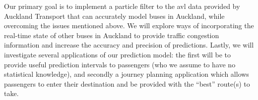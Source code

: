 \documentclass[12pt,a4paper]{article}
\newcommand{\pf}{particle filter}
\begin{document}
Our primary goal is to implement a \pf{} to the \gls{avl} data provided by Auckland Transport
that can accurately model buses in Auckland,
while overcoming the issues mentioned above.
We will explore ways of incorporating the real-time state of other buses in Auckland
to provide traffic congestion information and increase the accuracy and precision of predictions.
Lastly, we will investigate several applications of our prediction model:
the first will be to provide useful prediction intervals to passengers
(who we assume to have no statistical knowledge),
and secondly a journey planning application which allows passengers to enter their destination
and be provided with the ``best'' route(s) to take.














\end{document}

